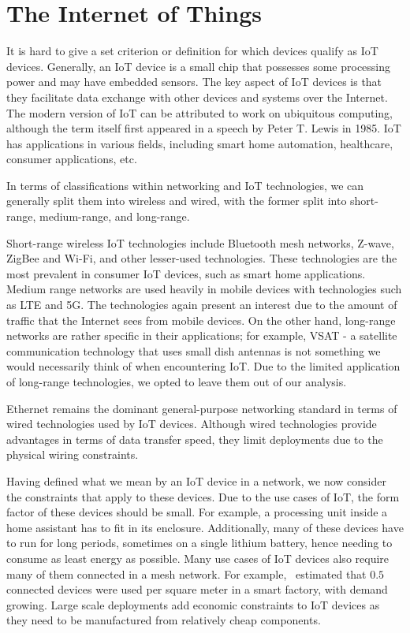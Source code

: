 \section{The Internet of Things}

It is hard to give a set criterion or definition for which devices qualify as IoT devices.
Generally, an IoT device is a small chip that possesses some processing power and may have embedded sensors.
The key aspect of IoT devices is that they facilitate data exchange with other devices and systems over the Internet.
The modern version of IoT can be attributed to work on ubiquitous computing, although the term itself first appeared in a speech by Peter T. Lewis in 1985.
IoT has applications in various fields, including smart home automation, healthcare, consumer applications, etc.

In terms of classifications within networking and IoT technologies, we can generally split them into wireless and wired, with the former split into short-range, medium-range, and long-range.

Short-range wireless IoT technologies include Bluetooth mesh networks, Z-wave, ZigBee and Wi-Fi, and other lesser-used technologies.
These technologies are the most prevalent in consumer IoT devices, such as smart home applications.
Medium range networks are used heavily in mobile devices with technologies such as LTE and 5G.
The technologies again present an interest due to the amount of traffic that the Internet sees from mobile devices.
On the other hand, long-range networks are rather specific in their applications; for example, VSAT - a satellite communication technology that uses small dish antennas is not something we would necessarily think of when encountering IoT.
Due to the limited application of long-range technologies, we opted to leave them out of our analysis.

Ethernet remains the dominant general-purpose networking standard in terms of wired technologies used by IoT devices.
Although wired technologies provide advantages in terms of data transfer speed, they limit deployments due to the physical wiring constraints.

Having defined what we mean by an IoT device in a network, we now consider the constraints that apply to these devices.
Due to the use cases of IoT, the form factor of these devices should be small.
For example, a processing unit inside a home assistant has to fit in its enclosure.
Additionally, many of these devices have to run for long periods, sometimes on a single lithium battery, hence needing to consume as least energy as possible.
Many use cases of IoT devices also require many of them connected in a mesh network.
For example,~\cite{ericsson_iot_2018} estimated that $0.5$ connected devices were used per square meter in a smart factory, with demand growing.
Large scale deployments add economic constraints to IoT devices as they need to be manufactured from relatively cheap components.

